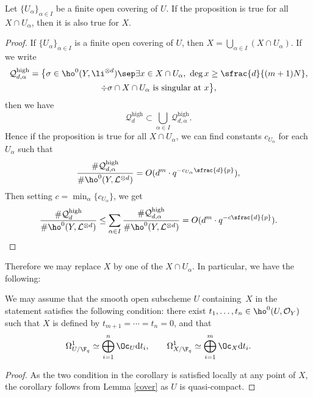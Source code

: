 \begin{lem}\label{cover}
Let $\{ U_{\alpha} \}_{\alpha\in I}$ be a finite open covering of $U$. If the proposition is true for all $X\cap U_{\alpha}$, then it is also true for $X$.
\end{lem}
\begin{proof}
If $\{ U_{\alpha} \}_{\alpha\in I}$ is a finite open covering of $U$, then $X=\bigcup_{\alpha\in I} (X\cap U_{\alpha})$. If we write\vspace*{-3pt}
\begin{multline*}
\mathcal{Q}_{d,\alpha}^{\mathrm{high}}= \bigl\{ \sigma\in \ho^0(Y,\li^{\otimes d})\sep \exists x\in X\cap U_{\alpha},\ \deg x\geq \sfrac{d}{(m+1)N},\\ \div \sigma\cap X\cap U_{\alpha} \text{ is singular at }x \bigr\},
\end{multline*}
then we have\vspace*{-3pt}
\[
\mathcal{Q}_{d}^{\mathrm{high}}\subset \bigcup_{\alpha\in I}\mathcal{Q}_{d,\alpha}^{\mathrm{high}}.
\]
Hence if the proposition is true for all $X\cap U_{\alpha}$, we can find constants $c_{U_{\alpha}}$ for each $U_{\alpha}$ such that\vspace*{-3pt}
\[
\frac{ \#\mathcal{Q}_{d,\alpha}^{\mathrm{high}}}{\# \ho^0(Y, \mathcal{L}^{\otimes d})}=O(d^{m}\cdot q^{-c_{U_{\alpha}}\sfrac{d}{p}}),
\]
Then setting $c=\min_{\alpha}\{ c_{U_{\alpha}} \}$, we get\vspace*{-3pt}
\[
\frac{ \#\mathcal{Q}_d^{\mathrm{high}}}{\# \ho^0(Y, \mathcal{L}^{\otimes d})}\leq \sum_{\alpha\in I} \frac{ \#\mathcal{Q}_{d,\alpha}^{\mathrm{high}}}{\# \ho^0(Y, \mathcal{L}^{\otimes d})}=O(d^{m}\cdot q^{-c\sfrac{d}{p}}).\qedhere
\]
\end{proof}
Therefore we may replace $X$ by one of the $X\cap U_{\alpha}$. In particular, we have the following:
\begin{cor}\label{trivi}
We may assume that the smooth open subscheme $U$ containing~$X$ in the statement satisfies the following condition: there exist $t_1, \dots, t_n\in \ho^0(U, \mathcal{O}_Y)$ such that $X$ is defined by $t_{m+1}=\cdots=t_n=0$, and that\vspace*{-3pt}
\[
\Omega_{U/\F_q}^1\simeq \bigoplus_{i=1}^n\Oc_U \mathrm{d} t_i,\qquad \Omega_{X/\F_q}^1\simeq \bigoplus_{i=1}^m\Oc_X\mathrm{d}t_i.
\]
\end{cor}
\begin{proof}[Proof]
As the two condition in the corollary is satisfied locally at any point of $X$, the corollary follows from Lemma \ref{cover} as $U$ is quasi-compact.
\end{proof}

